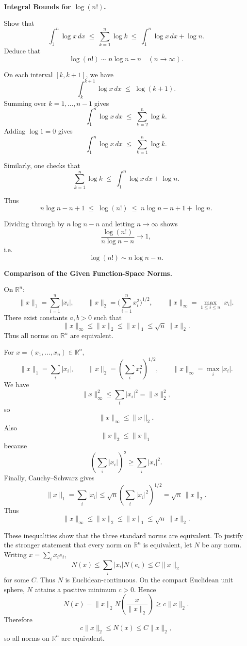 \begin{problem}[CP-II-0437]
\label{prob:cp-ii-0437}
\textbf{Integral Bounds for \(\log(n!)\).}

\hspace*{1.5em}Show that
\[
\int_1^n \log x \, dx \;\leq\; \sum_{k=1}^n \log k \;\leq\; \int_1^n \log x \, dx + \log n.
\]
Deduce that
\[
\log(n!) \sim n\log n - n \quad (n\to\infty).
\]
\end{problem}

\begin{solution}
On each interval $[k,k+1]$, we have
	\[
	\int_k^{k+1} \log x\,dx \;\leq\; \log(k+1).
	\]
	Summing over $k=1,\dots,n-1$ gives
	\[
	\int_1^n \log x\,dx \;\leq\; \sum_{k=2}^n \log k.
	\]
	Adding $\log 1=0$ gives
	\[
	\int_1^n \log x\,dx \;\leq\; \sum_{k=1}^n \log k.
	\]

	Similarly, one checks that
	\[
	\sum_{k=1}^n \log k \;\leq\; \int_1^n \log x\,dx + \log n.
	\]

	Thus
	\[
	n\log n - n + 1 \;\leq\; \log(n!) \;\leq\; n\log n - n + 1 + \log n.
	\]

	Dividing through by $n\log n - n$ and letting $n\to\infty$ shows
	\[
	\frac{\log(n!)}{n\log n - n} \to 1,
	\]
	i.e.
	\[
	\log(n!) \sim n\log n - n.
	\]
\end{solution}

\begin{problem}[CP-II-0439]
\label{prob:cp-ii-0439}
\textbf{Comparison of the Given Function-Space Norms.}

\hspace*{1.5em}On $\mathbb{R}^n$:
	\[
	\|x\|_1=\sum_{i=1}^n |x_i|,\qquad
	\|x\|_2=\Big(\sum_{i=1}^n x_i^2\Big)^{1/2},\qquad
	\|x\|_\infty=\max_{1\le i\le n}|x_i|.
	\]
	There exist constants $a,b>0$ such that
	\[
	\|x\|_\infty \le \|x\|_2 \le \|x\|_1 \le \sqrt{n}\,\|x\|_2.
	\]
	Thus all norms on $\mathbb{R}^n$ are equivalent.
\end{problem}

\begin{solution}
For \(x=(x_1,\ldots,x_n)\in\mathbb R^n\),
\[
\|x\|_1=\sum_i|x_i|,
\qquad
\|x\|_2=\left(\sum_i x_i^2\right)^{1/2},
\qquad
\|x\|_\infty=\max_i|x_i|.
\]
We have
\[
\|x\|_\infty^2
\le
\sum_i|x_i|^2
=
\|x\|_2^2,
\]
so
\[
\|x\|_\infty\le\|x\|_2.
\]
Also
\[
\|x\|_2
\le
\|x\|_1
\]
because
\[
\left(\sum_i|x_i|\right)^2
\ge
\sum_i|x_i|^2.
\]
Finally, Cauchy--Schwarz gives
\[
\|x\|_1
=
\sum_i|x_i|
\le
\sqrt n
\left(\sum_i|x_i|^2\right)^{1/2}
=
\sqrt n\,\|x\|_2.
\]
Thus
\[
\boxed{
\|x\|_\infty
\le
\|x\|_2
\le
\|x\|_1
\le
\sqrt n\,\|x\|_2.
}
\]

These inequalities show that the three standard norms are equivalent. To justify the stronger
statement that every norm on \(\mathbb R^n\) is equivalent, let \(N\) be any norm. Writing
\(x=\sum_i x_i e_i\),
\[
N(x)
\le
\sum_i|x_i|N(e_i)
\le
C\|x\|_2
\]
for some \(C\). Thus \(N\) is Euclidean-continuous. On the compact Euclidean unit sphere,
\(N\) attains a positive minimum \(c>0\). Hence
\[
N(x)
=
\|x\|_2
N\left(\frac{x}{\|x\|_2}\right)
\ge
c\|x\|_2.
\]
Therefore
\[
\boxed{
c\|x\|_2
\le
N(x)
\le
C\|x\|_2,
}
\]
so all norms on \(\mathbb R^n\) are equivalent.
\end{solution}


